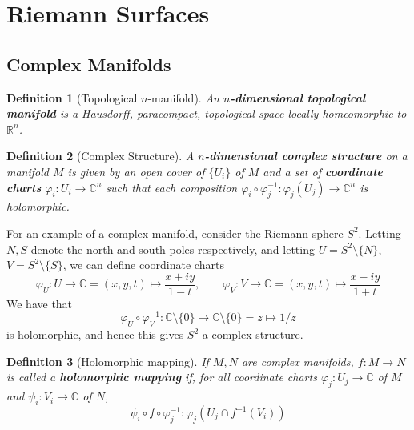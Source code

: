 \documentclass{article}
\newcommand{\mbb}[1]{\mathbb{#1}}
\newcommand{\reals}{\mbb{R}}
\newtheorem{definition}{Definition}
\begin{document}
\section{Riemann Surfaces}

\subsection{Complex Manifolds}

\begin{definition}[Topological \(n\)-manifold]
An \textbf{\(n\)-dimensional topological manifold} is a Hausdorff, paracompact, topological space locally homeomorphic to \(\reals^n\).
\end{definition}

\begin{definition}[Complex Structure]
A \textbf{\(n\)-dimensional complex structure} on a manifold \(M\) is given by an open cover of \(\{U_i\}\) of \(M\) and a set of \textbf{coordinate charts} \(\varphi_i: U_i \to \mbb{C}^n\) such that each composition \(\varphi_i \circ \varphi_j^{-1}: \varphi_j(U_j) \to \mbb{C}^n\) is holomorphic.
\end{definition}

\label{example:riemann_complex_structure}
For an example of a complex manifold, consider the Riemann sphere \(S^2\). Letting \(N, S\) denote the north and south poles respectively, and letting \(U = S^2 \setminus \{N\}\), \(V = S^2 \setminus \{S\}\), we can define coordinate charts
\begin{equation}\varphi_U: U \to \mbb{C} = (x, y, t) \mapsto \frac{x + iy}{1 - t}, \qquad \varphi_V: V \to \mbb{C} = (x, y, t) \mapsto \frac{x - iy}{1 + t}\end{equation}
We have that
\begin{equation}\varphi_U \circ \varphi_V^{-1}: \mbb{C} \setminus \{0\} \to \mbb{C} \setminus \{0\} = z \mapsto 1/z\end{equation}
is holomorphic, and hence this gives \(S^2\) a complex structure.

\begin{definition}[Holomorphic mapping]
If \(M, N\) are complex manifolds, \(f: M \to N\) is called a \textbf{holomorphic mapping} if, for all coordinate charts \(\varphi_j: U_j \to \mbb{C}\) of \(M\) and \(\psi_i: V_i \to \mbb{C}\) of \(N\),
\begin{equation}\psi_i \circ f \circ \varphi_j^{-1}: \varphi_j(U_j \cap f^{-1}(V_i))\end{equation}
\end{definition}
\end{document}
